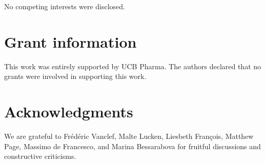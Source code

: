 \documentclass[9pt,a4paper,]{extarticle}
\theoremstyle{definition}
\theoremstyle{definition}
\theoremstyle{definition}
\theoremstyle{remark}
\begin{document}
No competing interests were disclosed.

\section{Grant information}\label{grant-information}

This work was entirely supported by UCB Pharma.
The authors declared that no grants were involved in supporting this work.

\section{Acknowledgments}\label{acknowledgments}

We are grateful to Frédéric Vanclef, Malte Lucken, Liesbeth François,
Matthew Page,
Massimo de Francesco, and Marina Bessarabova for fruitful discussions
and constructive criticisms.

{\small}
\end{document}
